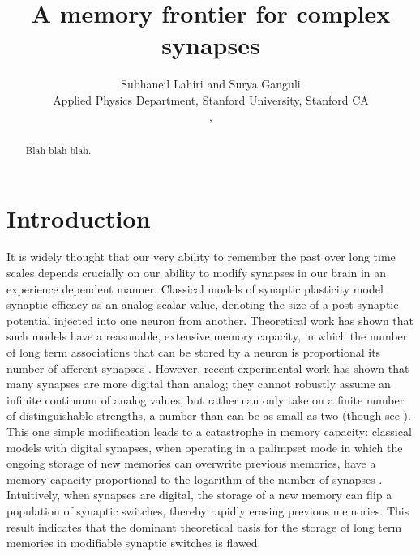 \documentclass{article} %
\title{A memory frontier for complex synapses}
\author{Subhaneil Lahiri and Surya Ganguli\\
Applied Physics Department, Stanford University, Stanford CA\\
\emaillink{sulahiri@stanford.edu}, \emaillink{sulahiri@stanford.edu}
%
}
\begin{document}
\maketitle




\begin{abstract}
  Blah blah blah.
\end{abstract}




%



\section{Introduction}\label{sec:intro}

It is widely thought that our very ability to remember the past over long time scales depends crucially on our ability to modify synapses in our brain in an experience dependent manner.
Classical models of synaptic plasticity model synaptic efficacy as an analog scalar value, denoting the size of a post-synaptic potential injected into one neuron from another.
Theoretical work has shown that such models have a reasonable, extensive memory capacity, in which the number of long term associations that can be stored by a neuron is proportional its number of afferent synapses \cite{Hopfield1982model,Amit1985hopfield,Gardner1988perceptron}.
However, recent experimental work has shown that many synapses are more digital than analog; they cannot robustly assume an infinite continuum of analog values, but rather can only take on a finite number of distinguishable strengths, a number than can be as small as two \cite{Bliss1993LTP,Petersen1998allornone,O'Connor2005switch} (though see \cite{Enoki2009graded}).
This one simple modification leads to a catastrophe in memory capacity:  classical models with digital synapses, when operating in a palimpset mode in which the ongoing storage of new memories can overwrite previous memories, have a memory capacity proportional to the logarithm of the number of synapses \cite{amit1992constraints,amit1994learning}.
Intuitively, when synapses are digital, the storage of a new memory can flip a population of synaptic switches, thereby rapidly erasing previous memories. This result indicates that the dominant theoretical basis for the storage of long term memories in modifiable synaptic switches is flawed.
\end{document}

